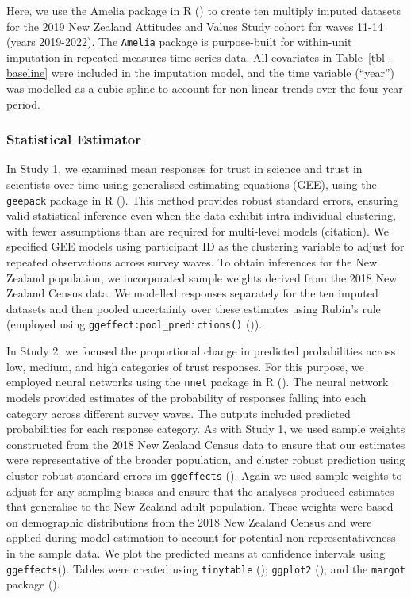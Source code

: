 \documentclass[
  single column]{article}
\begin{document}
Here, we use the Amelia package in R () to create ten multiply imputed datasets for the
2019 New Zealand Attitudes and Values Study cohort for waves 11-14
(years 2019-2022). The \texttt{Amelia} package is purpose-built for
within-unit imputation in repeated-measures time-series data. All
covariates in Table~\ref{tbl-baseline} were included in the imputation
model, and the time variable (``year'') was modelled as a cubic spline
to account for non-linear trends over the four-year period.

\subsubsection{Statistical Estimator}\label{statistical-estimator}

In Study 1, we examined mean responses for trust in science and trust in
scientists over time using generalised estimating equations (GEE), using
the \texttt{geepack} package in R (). This method provides robust standard errors,
ensuring valid statistical inference even when the data exhibit
intra-individual clustering, with fewer assumptions than are required
for multi-level models (citation). We specified GEE models using
participant ID as the clustering variable to adjust for repeated
observations across survey waves. To obtain inferences for the New
Zealand population, we incorporated sample weights derived from the 2018
New Zealand Census data. We modelled responses separately for the ten
imputed datasets and then pooled uncertainty over these estimates using
Rubin's rule (employed using \texttt{ggeffect:pool\_predictions()}
()).

In Study 2, we focused the proportional change in predicted
probabilities across low, medium, and high categories of trust
responses. For this purpose, we employed neural networks using the
\texttt{nnet} package in R (). The neural network models provided estimates of the probability
of responses falling into each category across different survey waves.
The outputs included predicted probabilities for each response category.
As with Study 1, we used sample weights constructed from the 2018 New
Zealand Census data to ensure that our estimates were representative of
the broader population, and cluster robust prediction using cluster
robust standard errors im \texttt{ggeffects}
(). Again we used sample
weights to adjust for any sampling biases and ensure that the analyses
produced estimates that generalise to the New Zealand adult population.
These weights were based on demographic distributions from the 2018 New
Zealand Census and were applied during model estimation to account for
potential non-representativeness in the sample data. We plot the
predicted means at confidence intervals using
\texttt{ggeffects}(). Tables
were created using \texttt{tinytable}
(); \texttt{ggplot2}
(); and the \texttt{margot}
package ().
\end{document}
